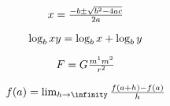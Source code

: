 \begin{equation}
    $$x = \frac{-b \pm \sqrt{b^2 - 4ac}}{2a}$$
\end{equation}

\begin{equation}
    $$\log_{b}xy = \log_{b}x + \log_{b}y$$
\end{equation}

\begin{equation}
    $$F = G\frac{m^1m^2}{r^2}$$
\end{equation}

\begin{equation}
    $$f(a) = \lim_{h \rightarrow \infinity} \frac{f(a + h) - f(a)}{h}$$
\end{equation}